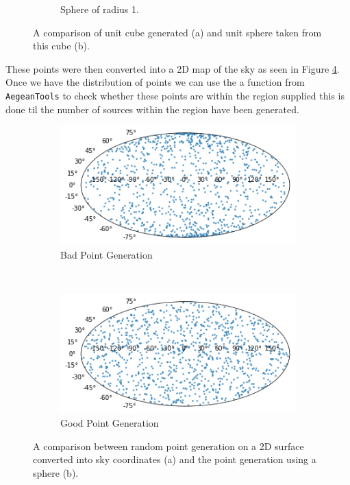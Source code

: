 \documentclass[a4paper, 10pt]{article}
\begin{document}
\begin{figure}[H]
\begin{subfigure}[t]{0.5\textwidth}
        \caption{Sphere of radius 1.}
    \end{subfigure}
    \caption{A comparison of unit cube generated (a) and unit sphere taken from this cube (b).}
    \label{fig:cub+sph}
\end{figure}

These points were then converted into a 2D map of the sky as seen in Figure \ref{fig:gpoint}. Once we have the distribution of points we can use the a function from \texttt{AegeanTools} \citet{Aegean} to check whether these points are within the region supplied this is done til the number of sources within the region have been generated.\\
\begin{figure}[H]
    \centering
    \begin{subfigure}[t]{0.5\textwidth}
        \centering
        \includegraphics[width=\textwidth, right]{map_bad.png}
        \caption{Bad Point Generation}
        \label{fig:bpoint}
    \end{subfigure}%
    ~ 
    \begin{subfigure}[t]{0.5\textwidth}
        \centering
        \includegraphics[width=\textwidth, left]{map_good.png}
        \caption{Good Point Generation}
        \label{fig:gpoint}
    \end{subfigure}
    \caption{A comparison between random point generation on a 2D surface converted into sky coordinates (a) and the point generation using a sphere (b).}
\end{figure}
\end{document}
